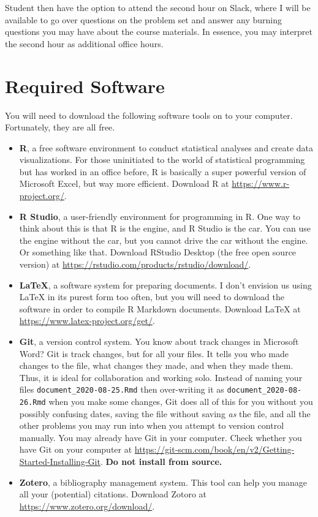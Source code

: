\documentclass[11pt,]{article}
\begin{document}
Student then have the option to attend the second hour on Slack, where I
will be available to go over questions on the problem set and answer any
burning questions you may have about the course materials. In essence,
you may interpret the second hour as additional office hours.

\hypertarget{required-software}{%
\section{Required Software}\label{required-software}}

You will need to download the following software tools on to your
computer. Fortunately, they are all free.

\begin{itemize}
\item
  \textbf{R}, a free software environment to conduct statistical
  analyses and create data visualizations. For those uninitiated to the
  world of statistical programming but has worked in an office before, R
  is basically a super powerful version of Microsoft Excel, but way more
  efficient. Download R at \url{https://www.r-project.org/}.
\item
  \textbf{R Studio}, a user-friendly environment for programming in R.
  One way to think about this is that R is the engine, and R Studio is
  the car. You can use the engine without the car, but you cannot drive
  the car without the engine. Or something like that. Download RStudio
  Desktop (the free open source version) at
  \url{https://rstudio.com/products/rstudio/download/}.
\item
  \textbf{LaTeX}, a software system for preparing documents. I don't
  envision us using LaTeX in its purest form too often, but you will
  need to download the software in order to compile R Markdown
  documents. Download LaTeX at \url{https://www.latex-project.org/get/}.
\item
  \textbf{Git}, a version control system. You know about track changes
  in Microsoft Word? Git is track changes, but for all your files. It
  tells you who made changes to the file, what changes they made, and
  when they made them. Thus, it is ideal for collaboration and working
  solo. Instead of naming your files \texttt{document\_2020-08-25.Rmd}
  then over-writing it as \texttt{document\_2020-08-26.Rmd} when you
  make some changes, Git does all of this for you without you possibly
  confusing dates, saving the file without saving \emph{as} the file,
  and all the other problems you may run into when you attempt to
  version control manually. You may already have Git in your computer.
  Check whether you have Git on your computer at
  \url{https://git-scm.com/book/en/v2/Getting-Started-Installing-Git}.
  \textbf{Do not install from source.}
\item
  \textbf{Zotero}, a bibliography management system. This tool can help
  you manage all your (potential) citations. Download Zotoro at
  \url{https://www.zotero.org/download/}.
\end{itemize}
\end{document}
